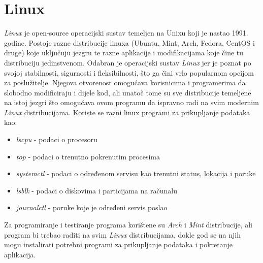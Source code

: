 \documentclass[zavrsnirad]{fer}
\begin{document}
\section{Linux}
\textit{Linux} je open-source operacijski sustav temeljen na Unixu koji je nastao 1991. godine. Postoje razne distribucije linuxa (Ubuntu, Mint, Arch, Fedora, CentOS i druge) koje uključuju jezgru te razne aplikacije i modifikacijama koje čine tu distribuciju jedinstvenom. Odabran je operacijski sustav \textit{Linux} jer je poznat po svojoj stabilnosti, sigurnosti i fleksibilnosti, što ga čini vrlo popularnom opcijom za poslužitelje. Njegova otvorenost omogućava korisnicima i programerima da slobodno modificiraju i dijele kod, ali unatoč tome su sve distribucije temeljene na istoj jezgri što omogućava ovom programu da ispravno radi na svim modernim \textit{Linux} distribucijama.
Koriste se razni linux programi za prikupljanje podataka kao:
\begin{itemize}
	\item  \textit{lscpu} - podaci o procesoru
	\item \textit{top} - podaci o trenutno pokrenutim procesima
	\item \textit{systemctl} - podaci o određenom servisu kao trenutni status, lokacija i poruke
	\item \textit{lsblk} -  podaci o diskovima i particijama na računalu
	\item \textit{journalctl} - poruke koje je određeni servis poslao
\end{itemize}
Za programiranje i testiranje programa korištene su \textit{Arch} i \textit{Mint} distribucije, ali program bi trebao raditi na svim \textit{Linux} distribucijama, dokle god se na njih mogu instalirati potrebni programi za prikupljanje podataka i pokretanje aplikacija.
\end{document}
